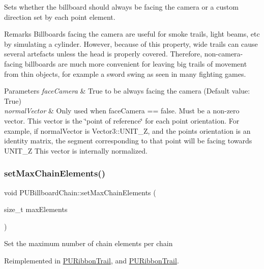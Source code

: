 Sets whether the billboard should always be facing the camera or a custom direction set by each point element. \begin{DoxyRemark}{Remarks}
Billboards facing the camera are useful for smoke trails, light beams, etc by simulating a cylinder. However, because of this property, wide trails can cause several artefacts unless the head is properly covered. Therefore, non-\/camera-\/facing billboards are much more convenient for leaving big trails of movement from thin objects, for example a sword swing as seen in many fighting games. 
\end{DoxyRemark}

\begin{DoxyParams}{Parameters}
{\em face\+Camera} & True to be always facing the camera (Default value\+: True) \\
\hline
{\em normal\+Vector} & Only used when face\+Camera == false. Must be a non-\/zero vector. This vector is the \char`\"{}point of reference\char`\"{} for each point orientation. For example, if normal\+Vector is Vector3\+::\+U\+N\+I\+T\+\_\+Z, and the point\textquotesingle{}s orientation is an identity matrix, the segment corresponding to that point will be facing towards U\+N\+I\+T\+\_\+Z This vector is internally normalized. \\
\hline
\end{DoxyParams}
\mbox{\label{classPUBillboardChain_aa58e00d60390334e66dd7742f708ee76}} 
\subsubsection{\texorpdfstring{set\+Max\+Chain\+Elements()}{setMaxChainElements()}\hspace{0.1cm}{\footnotesize\ttfamily [1/2]}}
{\footnotesize\ttfamily void P\+U\+Billboard\+Chain\+::set\+Max\+Chain\+Elements (\begin{DoxyParamCaption}\item[{size\+\_\+t}]{max\+Elements }\end{DoxyParamCaption})\hspace{0.3cm}{\ttfamily [virtual]}}

Set the maximum number of chain elements per chain 

Reimplemented in \hyperlink{classPURibbonTrail_af755423a7832221d273b9e2daae26dbe}{P\+U\+Ribbon\+Trail}, and \hyperlink{classPURibbonTrail_af755423a7832221d273b9e2daae26dbe}{P\+U\+Ribbon\+Trail}.

